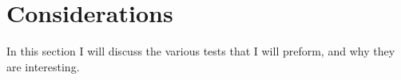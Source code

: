 \section{Considerations}
\label{considerations}

In this section I will discuss the various tests that I will preform, and why they are interesting. 

\subsection{}
